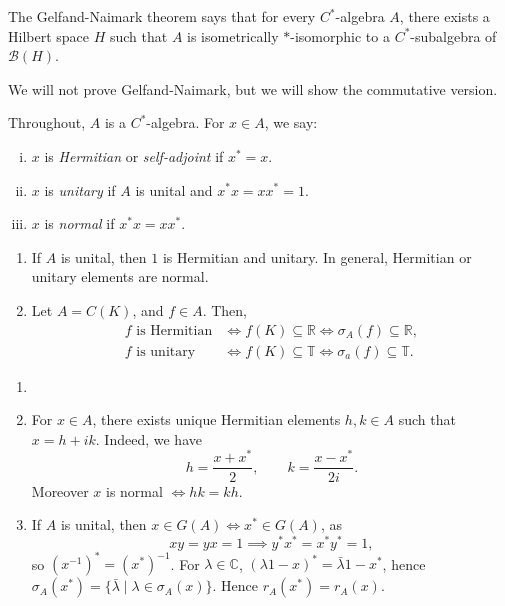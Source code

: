 \documentclass[12pt]{article}
\begin{document}
\begin{remark}
	The Gelfand-Naimark theorem says that for every $C^{\ast}$-algebra $A$, there exists a Hilbert space $H$ such that $A$ is isometrically $\ast$-isomorphic to a $C^{\ast}$-subalgebra of $\mathcal{B}(H)$.
\end{remark}

We will not prove Gelfand-Naimark, but we will show the commutative version.

\begin{definition}
	Throughout, $A$ is a $C^{\ast}$-algebra. For $x \in A$, we say:
	\begin{enumerate}[(i)]
		\item $x$ is \emph{Hermitian} or \emph{self-adjoint} if $x^{\ast} = x$.
		\item $x$ is \emph{unitary} if $A$ is unital and $x^{\ast} x = x x^{\ast} = 1$.
		\item $x$ is \emph{normal} if $x^{\ast} x = x x^{\ast}$.
	\end{enumerate}	
\end{definition}

\begin{exbox}
	\begin{enumerate}
		\item If $A$ is unital, then $1$ is Hermitian and unitary. In general, Hermitian or unitary elements are normal.
		\item Let $A = C(K)$, and $f \in A$. Then,
			\begin{align*}
				f \text{ is Hermitian} &\iff f(K) \subseteq \mathbb{R} \iff \sigma_A(f) \subseteq \mathbb{R}, \\
				f \text{ is unitary} &\iff f(K) \subseteq \mathbb{T} \iff \sigma_a(f) \subseteq \mathbb{T}.
			\end{align*}
	\end{enumerate}
\end{exbox}

\begin{remark}
	\begin{enumerate}
		\item[]
		\item For $x \in A$, there exists unique Hermitian elements $h, k \in A$ such that $x = h + ik$. Indeed, we have
			\[
			h = \frac{x + x^{\ast}}{2}, \qquad k = \frac{x - x^{\ast}}{2i}.
			\]
			Moreover $x$ is normal $\iff hk = kh$.
		\item If $A$ is unital, then $x \in G(A) \iff x^{\ast} \in G(A)$, as
			\[
			xy = yx = 1 \implies y^{\ast} x^{\ast} = x^{\ast} y^{\ast} = 1,
			\]
			so $(x^{-1})^{\ast} = (x^{\ast})^{-1}$. For $\lambda \in \mathbb{C}$, $(\lambda 1 - x)^{\ast} = \bar \lambda 1 - x^{\ast}$, hence $\sigma_A(x^{\ast}) = \{\bar \lambda \mid \lambda \in \sigma_A(x)\}$. Hence $r_A(x^{\ast}) = r_A(x)$.
	\end{enumerate}
\end{remark}
\end{document}
